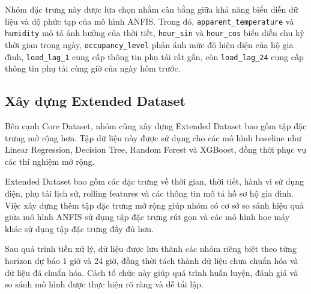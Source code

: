 Nhóm đặc trưng này được lựa chọn nhằm cân bằng giữa khả năng biểu diễn dữ liệu và độ phức tạp của mô hình ANFIS. Trong đó, \texttt{apparent\_temperature} và \texttt{humidity} mô tả ảnh hưởng của thời tiết, \texttt{hour\_sin} và \texttt{hour\_cos} biểu diễn chu kỳ thời gian trong ngày, \texttt{occupancy\_level} phản ánh mức độ hiện diện của hộ gia đình, \texttt{load\_lag\_1} cung cấp thông tin phụ tải rất gần, còn \texttt{load\_lag\_24} cung cấp thông tin phụ tải cùng giờ của ngày hôm trước.

\subsection{Xây dựng Extended Dataset}

Bên cạnh Core Dataset, nhóm cũng xây dựng Extended Dataset bao gồm tập đặc trưng mở rộng hơn. Tập dữ liệu này được sử dụng cho các mô hình baseline như Linear Regression, Decision Tree, Random Forest và XGBoost, đồng thời phục vụ các thí nghiệm mở rộng.

Extended Dataset bao gồm các đặc trưng về thời gian, thời tiết, hành vi sử dụng điện, phụ tải lịch sử, rolling features và các thông tin mô tả hồ sơ hộ gia đình. Việc xây dựng thêm tập đặc trưng mở rộng giúp nhóm có cơ sở so sánh hiệu quả giữa mô hình ANFIS sử dụng tập đặc trưng rút gọn và các mô hình học máy khác sử dụng tập đặc trưng đầy đủ hơn.

Sau quá trình tiền xử lý, dữ liệu được lưu thành các nhóm riêng biệt theo từng horizon dự báo 1 giờ và 24 giờ, đồng thời tách thành dữ liệu chưa chuẩn hóa và dữ liệu đã chuẩn hóa. Cách tổ chức này giúp quá trình huấn luyện, đánh giá và so sánh mô hình được thực hiện rõ ràng và dễ tái lập.
